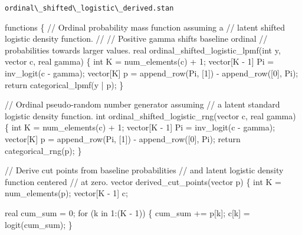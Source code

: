 \documentclass[
  letterpaper,
  DIV=11,
  numbers=noendperiod]{scrartcl}
\newenvironment{Shaded}{\begin{snugshade}}{\end{snugshade}}
\newcommand{\CommentTok}[1]{\textcolor[rgb]{0.37,0.37,0.37}{#1}}
\newcommand{\ControlFlowTok}[1]{\textcolor[rgb]{0.00,0.23,0.31}{#1}}
\newcommand{\DataTypeTok}[1]{\textcolor[rgb]{0.68,0.00,0.00}{#1}}
\newcommand{\DecValTok}[1]{\textcolor[rgb]{0.68,0.00,0.00}{#1}}
\newcommand{\KeywordTok}[1]{\textcolor[rgb]{0.00,0.23,0.31}{#1}}
\newcommand{\NormalTok}[1]{\textcolor[rgb]{0.00,0.23,0.31}{#1}}
\begin{document}
\begin{codelisting}

\caption{\texttt{ordinal\textbackslash\_shifted\textbackslash\_logistic\textbackslash\_derived.stan}}

\begin{Shaded}
\begin{Highlighting}[]
\KeywordTok{functions}\NormalTok{ \{}
  \CommentTok{// Ordinal probability mass function assuming a}
  \CommentTok{// latent shifted logistic density function.}
  \CommentTok{//}
  \CommentTok{// Positive gamma shifts baseline ordinal}
  \CommentTok{// probabilities towards larger values.}
  \DataTypeTok{real}\NormalTok{ ordinal\_shifted\_logistic\_lpmf(}\DataTypeTok{int}\NormalTok{ y, }\DataTypeTok{vector}\NormalTok{ c, }\DataTypeTok{real}\NormalTok{ gamma) \{}
    \DataTypeTok{int}\NormalTok{ K = num\_elements(c) + }\DecValTok{1}\NormalTok{;}
    \DataTypeTok{vector}\NormalTok{[K {-} }\DecValTok{1}\NormalTok{] Pi = inv\_logit(c {-} gamma);}
    \DataTypeTok{vector}\NormalTok{[K] p = append\_row(Pi, [}\DecValTok{1}\NormalTok{]\textquotesingle{}) {-} append\_row([}\DecValTok{0}\NormalTok{]\textquotesingle{}, Pi);}
    \ControlFlowTok{return}\NormalTok{ categorical\_lpmf(y | p);}
\NormalTok{  \}}

  \CommentTok{// Ordinal pseudo{-}random number generator assuming}
  \CommentTok{// a latent standard logistic density function.}
  \DataTypeTok{int}\NormalTok{ ordinal\_shifted\_logistic\_rng(}\DataTypeTok{vector}\NormalTok{ c, }\DataTypeTok{real}\NormalTok{ gamma) \{}
    \DataTypeTok{int}\NormalTok{ K = num\_elements(c) + }\DecValTok{1}\NormalTok{;}
    \DataTypeTok{vector}\NormalTok{[K {-} }\DecValTok{1}\NormalTok{] Pi = inv\_logit(c {-} gamma);}
    \DataTypeTok{vector}\NormalTok{[K] p = append\_row(Pi, [}\DecValTok{1}\NormalTok{]\textquotesingle{}) {-} append\_row([}\DecValTok{0}\NormalTok{]\textquotesingle{}, Pi);}
    \ControlFlowTok{return}\NormalTok{ categorical\_rng(p);}
\NormalTok{  \}}

  \CommentTok{// Derive cut points from baseline probabilities}
  \CommentTok{// and latent logistic density function centered}
  \CommentTok{// at zero.}
  \DataTypeTok{vector}\NormalTok{ derived\_cut\_points(}\DataTypeTok{vector}\NormalTok{ p) \{}
    \DataTypeTok{int}\NormalTok{ K = num\_elements(p);}
    \DataTypeTok{vector}\NormalTok{[K {-} }\DecValTok{1}\NormalTok{] c;}

    \DataTypeTok{real}\NormalTok{ cum\_sum = }\DecValTok{0}\NormalTok{;}
    \ControlFlowTok{for}\NormalTok{ (k }\ControlFlowTok{in} \DecValTok{1}\NormalTok{:(K {-} }\DecValTok{1}\NormalTok{)) \{}
\NormalTok{      cum\_sum += p[k];}
\NormalTok{      c[k] = logit(cum\_sum);}
\NormalTok{    \}}


\end{Highlighting}
\end{Shaded}
\end{codelisting}
\end{document}
